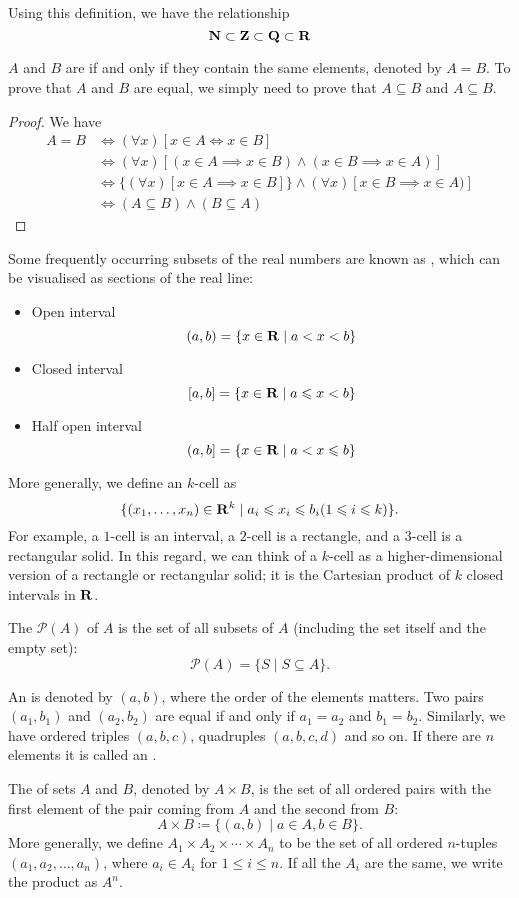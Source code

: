 Using this definition, we have the relationship 
\[ \mathbf N \subset \mathbf Z \subset \mathbf Q \subset \mathbf R \]

$A$ and $B$ are  if and only if they contain the same elements, denoted by $A=B$. To prove that $A$ and $B$ are equal, we simply need to prove that $A \subseteq B$ and $A \subseteq B$.

\begin{proof}
We have 
\begin{align*}
A = B &\iff (\forall x)[x \in A \iff x \in B] \\
&\iff (\forall x)[(x \in A \implies x \in B) \land (x \in B \implies x \in A)] \\
&\iff \{(\forall x)[x \in A \implies x \in B]\} \land {(\forall x)[x \in B \implies x \in A)]} \\
&\iff (A \subseteq B) \land (B \subseteq A)
\end{align*}
\end{proof}

Some frequently occurring subsets of the real numbers are known as , which can be visualised as sections of the real line:
\begin{itemize}
\item Open interval
\[ (a,b) = \{x\in\mathbf R \mid a<x<b\} \]
\item Closed interval
\[ [a,b] = \{x\in\mathbf R \mid a\leqslant x<b\} \]
\item Half open interval
\[ (a,b] = \{x\in\mathbf R \mid a<x\leqslant b\} \]
\end{itemize}
More generally, we define an $k$-cell as
\[\{(x_1,\dots,x_n)\in\mathbf R^k\mid a_i\leqslant x_i\leqslant b_i (1\leqslant i\leqslant k)\}.\]
For example, a $1$-cell is an interval, a $2$-cell is a rectangle, and a $3$-cell is a rectangular solid. In this regard, we can think of a $k$-cell as a higher-dimensional version of a rectangle or rectangular solid; it is the Cartesian product of $k$ closed intervals in $\mathbf R$.

The  $\mathcal{P}(A)$ of $A$ is the set of all subsets of $A$ (including the set itself and the empty set):
\[\mathcal{P}(A)=\{S\mid S\subseteq A\}.\]

An  is denoted by $(a,b)$, where the order of the elements matters. Two pairs $(a_1,b_1)$ and $(a_2,b_2)$ are equal if and only if $a_1=a_2$ and $b_1=b_2$.  Similarly, we have ordered triples $(a,b,c)$, quadruples $(a,b,c,d)$ and so on. If there are $n$ elements it is called an .

The  of sets $A$ and $B$, denoted by $A \times B$, is the set of all ordered pairs with the first element of the pair coming from $A$ and the second from $B$:
\[A\times B\coloneqq\{(a,b)\mid a\in A,b\in B\}.\]
More generally, we define $A_1 \times A_2 \times \cdots \times A_n$ to be the set of all ordered $n$-tuples $(a_1, a_2, \dots, a_n)$, where $a_i \in A_i$ for $1 \le i \le n$. If all the $A_i$ are the same, we write the product as $A^n$.

